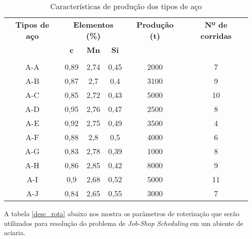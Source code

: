 \begin{table}[H]
\begin{center}
\begin{tabular}{|c|c|c|c|c|c|}
\hline
\multicolumn{ 1}{|c|}{\textbf{Tipos de aço}} & \multicolumn{ 3}{c|}{\textbf{Elementos (\%)}} & \multicolumn{ 1}{c|}{\textbf{Produção (t)}} & \multicolumn{ 1}{c|}{\textbf{Nº de corridas}} \\ \cline{ 2- 4}
\multicolumn{ 1}{|c|}{} & \multicolumn{ 1}{c|}{\textbf{c}} & \multicolumn{ 1}{c|}{\textbf{Mn}} & \multicolumn{ 1}{c|}{\textbf{Si}} & \multicolumn{ 1}{c|}{} & \multicolumn{ 1}{c|}{} \\ 
\multicolumn{ 1}{|c|}{} & \multicolumn{ 1}{c|}{} & \multicolumn{ 1}{c|}{} & \multicolumn{ 1}{c|}{} & \multicolumn{ 1}{c|}{} & \multicolumn{ 1}{c|}{} \\ \hline
A-A & 0,89 & 2,74 & 0,45 & 2000 & 7 \\ \hline
A-B & 0,87 & 2,7 & 0,4 & 3100 & 9 \\ \hline
A-C & 0,85 & 2,72 & 0,43 & 5000 & 10 \\ \hline
A-D & 0,95 & 2,76 & 0,47 & 2500 & 8 \\ \hline
A-E & 0,92 & 2,75 & 0,49 & 3500 & 4 \\ \hline
A-F & 0,88 & 2,8 & 0,5 & 4000 & 6 \\ \hline
A-G & 0,83 & 2,78 & 0,39 & 1000 & 8 \\ \hline
A-H & 0,86 & 2,85 & 0,42 & 8000 & 9 \\ \hline
A-I & 0,9 & 2,68 & 0,52 & 5000 & 11 \\ \hline
A-J & 0,84 & 2,65 & 0,55 & 3000 & 7 \\ \hline
\end{tabular}
\end{center}
\caption{Características de produção dos tipos de aço}
\label{tipo_aco}
\end{table}

A tabela \ref{desc_rota} abaixo nos mostra os parâmetros de roterização que serão utilizados para resolução do problema de {\it Job-Shop Scheduling} em um abiente de aciaria.

